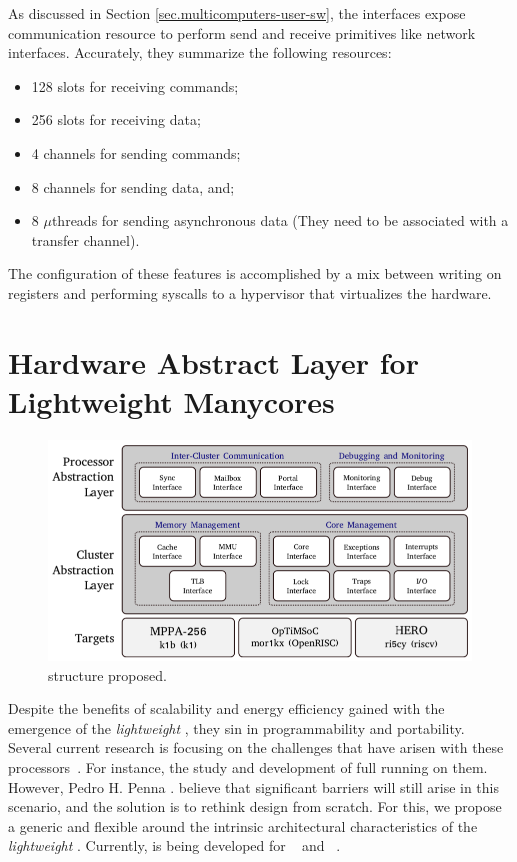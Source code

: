 		As discussed in Section \ref{sec.multicomputers-user-sw}, the \noc interfaces
		expose communication resource to perform send and receive primitives
		like network interfaces.
		Accurately, they summarize the following resources:

		\begin{itemize}
			\item 128 slots for receiving commands;
			\item 256 slots for receiving data;
			\item 4 channels for sending commands;
			\item 8 channels for sending data, and;
			\item 8 $\mu$threads for sending asynchronous data
				(They need to be associated with a transfer channel).
		\end{itemize}

		The configuration of these features is accomplished by a mix between
		writing on \dma registers and performing syscalls to a hypervisor
		that virtualizes the \mppa hardware.	
	
\section{Hardware Abstract Layer for Lightweight Manycores}
\label{sec.hal}

	\begin{figure}[h]
		\centering
		\includegraphics[width=.9\textwidth]{images/hal-struct.png}

		\caption{
			\hal structure proposed.
		}\par
		\label{fig.hal-struct}
	\end{figure}
	
	Despite the benefits of scalability and energy efficiency gained with the
	emergence of the \textit{lightweight \manycores}, they sin in programmability
	and portability.
	Several current research is focusing on the challenges that have arisen with
	these processors~\cite{christgau2017, gamell2012, serres2011}.
	For instance, the study and development of full \oses running on them.
	However, Pedro H. Penna \etal. believe that significant barriers will still
	arise in this scenario, and the solution is to rethink \os design from scratch.
	For this, we propose a generic and flexible \hal around the intrinsic
	architectural characteristics of the \textit{lightweight \manycores}.
	Currently, \hal is being developed for \mppa~\cite{DeDinechin2013-1} and
	\optimsoc~\cite{Wallentowitz2013}.

